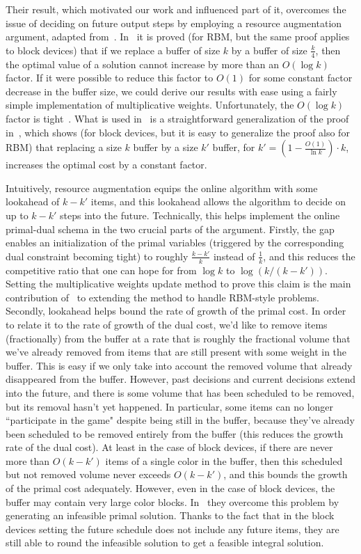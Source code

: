 \documentclass[12pt]{article}
\begin{document}
Their result, which motivated our work and
influenced part of it, overcomes the issue of deciding on
future output steps by employing a resource augmentation 
argument, adapted from~\cite{ERW09}. In~\cite{EW05,ERW09} 
it is proved (for RBM, but the same proof applies to block
devices) that if we replace a buffer of size $k$ by a buffer of 
size $\frac{k}{4}$, then the optimal value of a solution cannot 
increase by more than an $O(\log k)$ factor. If it were possible 
to reduce this factor to $O(1)$ for some constant factor decrease
in the buffer size, we could derive our results with ease using 
a fairly simple implementation of multiplicative weights. 
Unfortunately, the $O(\log k)$ factor is tight~\cite{Abo08}.
What is used in~\cite{ACER12} is a straightforward generalization 
of the proof in~\cite{ERW09}, which shows (for block devices,
but it is easy to generalize the proof also for RBM) that replacing 
a size $k$ buffer by a size $k'$ buffer, for 
$k' = \left(1 - \frac{O(1)}{\ln k}\right)\cdot k$, increases the
optimal cost by a constant factor. 

Intuitively, resource augmentation
equips the online algorithm with some lookahead of $k-k'$ items,
and this lookahead allows the algorithm to decide on up to $k-k'$ 
steps into the future. Technically, this helps implement the online
primal-dual schema in the two crucial parts of the argument.
Firstly, the gap enables an initialization of the primal variables
(triggered by the corresponding dual constraint becoming tight)
to roughly $\frac{k-k'}{k}$ instead of $\frac 1 k$, and this reduces
the competitive ratio that one can hope for from $\log k$ to 
$\log(k/(k-k'))$.
Setting the multiplicative weights update method to prove this claim
is the main contribution of~\cite{ACER12} to extending the method
to handle RBM-style problems.
Secondly, lookahead helps bound the rate of
growth of the primal cost. In order to relate it to the rate of growth
of the dual cost, we'd like to remove items (fractionally) from the
buffer at a rate that is roughly the fractional volume that we've
already removed from items that are still present with some
weight in the buffer. This is easy if we only take into account
the removed volume that already disappeared from the buffer.
However, past decisions and current decisions extend into the
future, and there is some volume that has been scheduled to be
removed, but its removal hasn't yet happened. In particular,
some items can no longer ``participate in the game" despite
being still in the buffer, because they've already been scheduled
to be removed entirely from the buffer (this reduces the growth
rate of the dual cost). At least in the
case of block devices, if there are never more than $O(k-k')$
items of a single color in the buffer, then this scheduled but
not removed volume never exceeds $O(k-k')$, and this bounds
the growth of the primal cost adequately. However, even in the
case of block devices, the buffer may contain very large color
blocks. In~\cite{ACER12} they overcome this problem by generating
an infeasible primal solution. Thanks to the fact that in the
block devices setting the future schedule does not include any
future items, they are still able to round the infeasible solution
to get a feasible integral solution.
\end{document}
